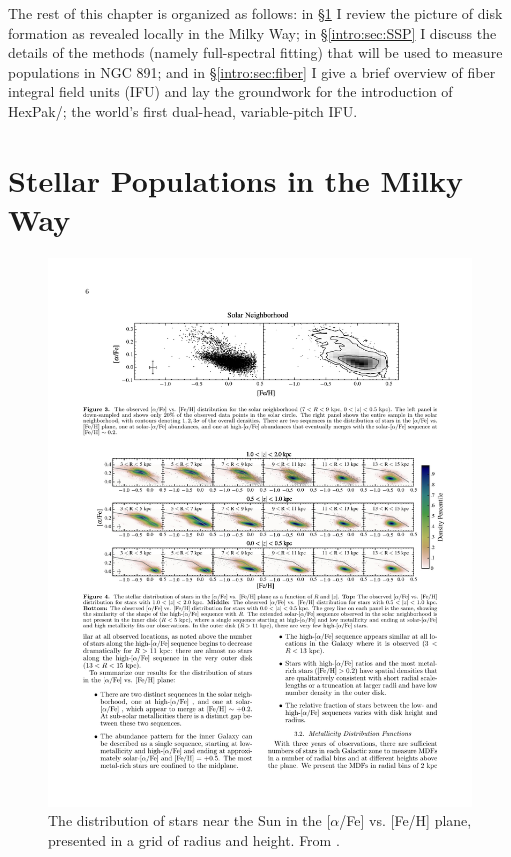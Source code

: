 The rest of this chapter is organized as follows: in
\S\ref{intro:sec:MW} I review the picture of disk formation as
revealed locally in the Milky Way; in \S\ref{intro:sec:SSP} I discuss
the details of the methods (namely full-spectral fitting) that will be
used to measure populations in NGC 891; and in \S\ref{intro:sec:fiber}
I give a brief overview of fiber integral field units (IFU) and lay
the groundwork for the introduction of HexPak/\GP; the world's first
dual-head, variable-pitch IFU.

\section{Stellar Populations in the Milky Way}
\label{intro:sec:MW}
\begin{figure}
  \centering
  \includegraphics[width=\textwidth]{Introduction/figs/hayden_15.pdf}
  \caption[Metallicity and abundance of solar cylinder stars as a
  function of radius and
  height]{\fixspacing\label{intro:fig:hayden}The distribution of stars
    near the Sun in the [$\alpha$/Fe] vs. [Fe/H] plane, presented in a
    grid of radius and height. From \citet{Hayden15}.}
\end{figure}

